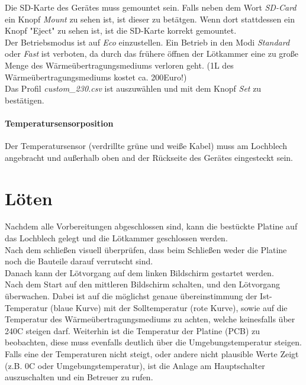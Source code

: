 \documentclass{\basedir/fablab-document}
\renewcommand{\todo}[1]{\textbf{\color{red}{TODO: #1}}}
\begin{document}
Die SD-Karte des Ger{\"a}tes muss gemountet sein. Falls neben dem Wort \textit{SD-Card} ein Knopf \textit{Mount} zu sehen ist, ist dieser zu bet{\"a}tgen. Wenn dort stattdessen ein Knopf "Eject" zu sehen ist, ist die SD-Karte korrekt gemountet.\\

Der Betriebsmodus ist auf \textit{Eco} einzustellen. Ein Betrieb in den Modi \textit{Standard} oder \textit{Fast} ist verboten, da durch das fr{\"u}here {\"o}ffnen der L{\"o}tkammer eine zu gro{\ss}e Menge des W{\"a}rme{\"u}bertragungsmediums verloren geht. (1L des W{\"a}rme{\"u}bertragungsmediums kostet ca. 200Euro!)\\

Das Profil \textit{custom\_230.csv} ist auszuw{\"a}hlen und mit dem Knopf \textit{Set} zu best{\"a}tigen.\\


\paragraph{Temperatursensorposition}

Der Temperatursensor (verdrillte gr{\"u}ne und wei{\ss}e Kabel) muss am Lochblech angebracht und au{\ss}erhalb oben and der R{\"u}ckseite des Ger{\"a}tes eingesteckt sein.


\section{L{\"o}ten}

Nachdem alle Vorbereitungen abgeschlossen sind, kann die best{\"u}ckte Platine auf das Lochblech gelegt und die L{\"o}tkammer geschlossen werden.\\

Nach dem schlie{\ss}en visuell {\"u}berpr{\"u}fen, dass beim Schlie{\ss}en weder die Platine noch die Bauteile darauf verrutscht sind.\\

Danach kann der L{\"o}tvorgang auf dem linken Bildschirm gestartet werden.\\


Nach dem Start auf den mittleren Bildschirm schalten, und den L{\"o}tvorgang {\"u}berwachen. Dabei ist auf die m{\"o}glichst genaue {\"u}bereinstimmung der Ist-Temperatur (blaue Kurve) mit der Solltemperatur (rote Kurve), sowie auf die Temperatur des W{\"a}rme{\"u}bertragungsmediums zu achten, welche keinesfalls {\"u}ber 240\textdegree C steigen darf. Weiterhin ist die Temperatur der Platine (PCB) zu beobachten, diese muss evenfalls deutlich über die Umgebungstemperatur steigen. Falls eine der Temperaturen nicht steigt, oder andere nicht plausible Werte Zeigt (z.B. 0\textdegree C oder Umgebungstemperatur), ist die Anlage am Hauptschalter auszuschalten und ein Betreuer zu rufen.
\end{document}
